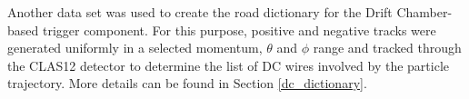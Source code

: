Another data set was used to create the road dictionary for the Drift Chamber-based trigger component.  For this purpose, positive and negative tracks were generated uniformly  in a selected momentum, $\theta$ and $\phi$ range and tracked through the CLAS12 detector to determine the list of DC wires involved by the particle trajectory. More details can be found in Section \ref{dc_dictionary}.
